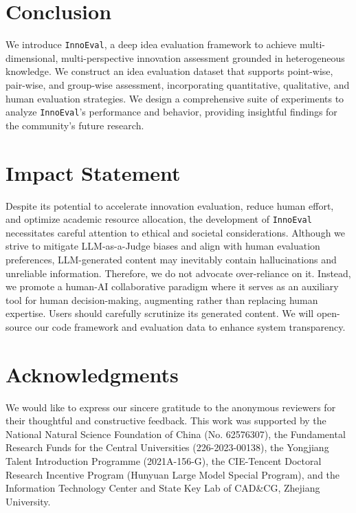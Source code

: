 \documentclass{article}
\newcommand{\ours}{\texttt{InnoEval}}
\theoremstyle{plain}
\theoremstyle{definition}
\theoremstyle{remark}
\begin{document}










\section{Conclusion}
We introduce {\ours}, a deep idea evaluation framework to achieve multi-dimensional, multi-perspective innovation assessment grounded in heterogeneous knowledge.
We construct an idea evaluation dataset that supports point-wise, pair-wise, and group-wise assessment, incorporating quantitative, qualitative, and human evaluation strategies.
We design a comprehensive suite of experiments to analyze {\ours}'s performance and behavior, providing insightful findings for the community's future research.

\section*{Impact Statement}
Despite its potential to accelerate innovation evaluation, reduce human effort, and optimize academic resource allocation, the development of {\ours} necessitates careful attention to ethical and societal considerations.
Although we strive to mitigate LLM-as-a-Judge biases and align with human evaluation preferences, LLM-generated content may inevitably contain hallucinations and unreliable information.
Therefore, we do not advocate over-reliance on it.
Instead, we promote a human-AI collaborative paradigm where it serves as an auxiliary tool for human decision-making, augmenting rather than replacing human expertise.
Users should carefully scrutinize its generated content.
We will open-source our code framework and evaluation data to enhance system transparency.

\section*{Acknowledgments}
We would like to express our sincere gratitude to the anonymous reviewers for their thoughtful and constructive feedback. This work was supported by the National Natural Science Foundation of China (No. 62576307), the Fundamental Research Funds for the Central Universities (226-2023-00138), the Yongjiang Talent Introduction Programme (2021A-156-G), the CIE-Tencent Doctoral Research Incentive Program (Hunyuan Large Model Special Program), and the Information Technology Center and State Key Lab of CAD\&CG, Zhejiang University.
\end{document}
